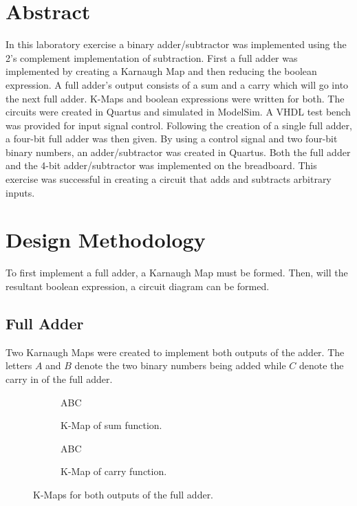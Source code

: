 \documentclass[CMPE]{KGCOEReport}
\begin{document}
\maketitle

\section*{Abstract}
In this laboratory exercise a binary adder/subtractor was implemented using the 2's complement implementation of subtraction. First a full adder was implemented by creating a Karnaugh Map and then reducing the boolean expression. A full adder's output consists of a sum and a carry which will go into the next full adder. K-Maps and boolean expressions were written for both. The circuits were created in Quartus and simulated in ModelSim. A VHDL test bench was provided for input signal control. Following the creation of a single full adder, a four-bit full adder was then given. By using a control signal and two four-bit binary numbers, an adder/subtractor was created in Quartus. Both the full adder and the 4-bit adder/subtractor was implemented on the breadboard. This exercise was successful in creating a circuit that adds and subtracts arbitrary inputs.

\section*{Design Methodology}

To first implement a full adder, a Karnaugh Map must be formed. Then, will the resultant boolean expression, a circuit diagram can be formed.

\subsection*{Full Adder}

Two Karnaugh Maps were created to implement both outputs of the adder. The letters $A$ and $B$ denote the two binary numbers being added while $C$ denote the carry in of the full adder.

\begin{figure}[h!]
	\begin{subfigure}{.5\textwidth}
		\centering
		\begin{Karnaugh24}{A}{BC}
		\end{Karnaugh24}
		\caption{K-Map of sum function.}
		\label{fig:sum}
	\end{subfigure}
	\begin{subfigure}{.5\textwidth}
		\centering
		\begin{Karnaugh24}{A}{BC}
		\end{Karnaugh24}
		\caption{K-Map of carry function.}
		\label{fig:carry}
	\end{subfigure}
	
	\caption{K-Maps for both outputs of the full adder.}
	\label{fig:kmap}
\end{figure}
\end{document}

